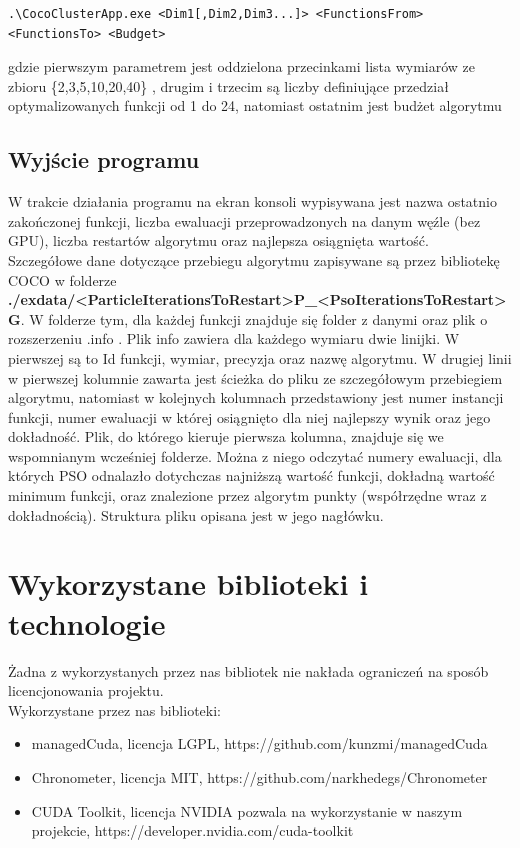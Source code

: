 \documentclass[12pt, twoside, openany, abstract=on]{report}
\theoremstyle{definition}
\begin{document}
\begin{lstlisting}[frame=single]
.\CocoClusterApp.exe <Dim1[,Dim2,Dim3...]> <FunctionsFrom> <FunctionsTo> <Budget>
\end{lstlisting}
gdzie pierwszym parametrem jest oddzielona przecinkami lista wymiarów ze zbioru \{2,3,5,10,20,40\} , drugim i trzecim są liczby definiujące przedział optymalizowanych funkcji od 1 do 24, natomiast ostatnim jest budżet algorytmu 

\section{Wyjście programu}
W trakcie działania programu na ekran konsoli wypisywana jest nazwa ostatnio zakończonej funkcji, liczba ewaluacji przeprowadzonych na danym węźle (bez GPU), liczba restartów algorytmu oraz najlepsza osiągnięta wartość.\\

Szczegółowe dane dotyczące przebiegu algorytmu zapisywane są przez bibliotekę COCO w folderze \textbf{./exdata/<ParticleIterationsToRestart>P\_<PsoIterationsToRestart>G}. W folderze tym, dla każdej funkcji znajduje się folder z danymi oraz plik o rozszerzeniu .info . Plik info zawiera dla każdego wymiaru dwie linijki. W pierwszej są to Id funkcji, wymiar, precyzja oraz nazwę algorytmu. W drugiej linii w pierwszej kolumnie zawarta jest ścieżka do pliku ze szczegółowym przebiegiem algorytmu, natomiast w kolejnych kolumnach przedstawiony jest numer instancji funkcji, numer ewaluacji w której osiągnięto dla niej najlepszy wynik oraz jego dokładność. 
Plik, do którego kieruje pierwsza kolumna, znajduje się we wspomnianym wcześniej folderze. Można z niego odczytać numery ewaluacji, dla których PSO odnalazło dotychczas najniższą wartość funkcji, dokładną wartość minimum funkcji, oraz znalezione przez algorytm punkty (współrzędne wraz z dokładnością). Struktura pliku opisana jest w jego nagłówku. 


\chapter{Wykorzystane biblioteki i technologie}
Żadna z wykorzystanych przez nas bibliotek nie nakłada ograniczeń na sposób licencjonowania projektu. \\

Wykorzystane przez nas biblioteki:

\begin{itemize}
\item managedCuda, licencja LGPL, https://github.com/kunzmi/managedCuda
\item Chronometer, licencja MIT, https://github.com/narkhedegs/Chronometer
\item CUDA Toolkit, licencja NVIDIA pozwala na wykorzystanie w naszym projekcie, https://developer.nvidia.com/cuda-toolkit
\end{itemize}
\end{document}
